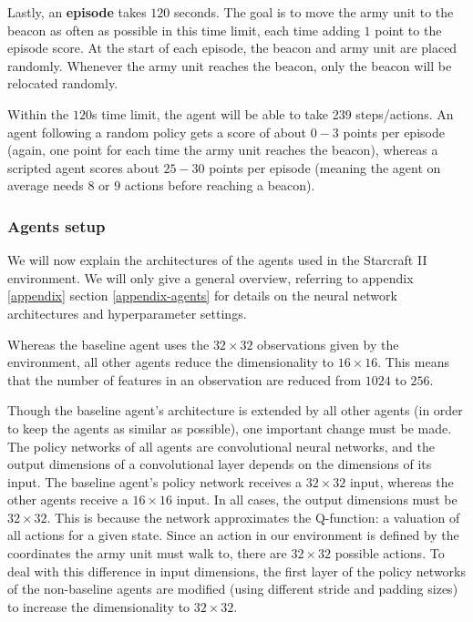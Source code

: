 Lastly, an \textbf{episode} takes $120$ seconds. The goal is to move the army unit to the beacon as often as possible in this time limit, each time adding $1$ point to the episode score. At the start of each episode, the beacon and army unit are placed randomly. Whenever the army unit reaches the beacon, only the beacon will be relocated randomly. 

Within the $120$s time limit, the agent will be able to take 239 steps/actions. An agent following a random policy gets a score of about $0-3$ points per episode (again, one point for each time the army unit reaches the beacon), whereas a scripted agent scores about $25-30$ points per episode (meaning the agent on average needs $8$ or $9$ actions before reaching a beacon).

\subsubsection{Agents setup}
We will now explain the architectures of the agents used in the Starcraft II environment. We will only give a general overview, referring to appendix \ref{appendix} section \ref{appendix-agents} for details on the neural network architectures and hyperparameter settings. 

Whereas the baseline agent uses the $32 \times 32$ observations given by the environment, all other agents reduce the dimensionality to $16 \times 16$. This means that the number of features in an observation are reduced from $1024$ to $256$.

Though the baseline agent's architecture is extended by all other agents (in order to keep the agents as similar as possible), one important change must be made. The policy networks of all agents are convolutional neural networks, and the output dimensions of a convolutional layer depends on the dimensions of its input. The baseline agent's policy network receives a $32 \times 32$ input, whereas the other agents receive a $16 \times 16$ input. In all cases, the output dimensions must be $32 \times 32$. This is because the network approximates the Q-function: a valuation of all actions for a given state. Since an action in our environment is defined by the coordinates the army unit must walk to, there are $32 \times 32$ possible actions. To deal with this difference in input dimensions, the first layer of the policy networks of the non-baseline agents are modified (using different stride and padding sizes) to increase the dimensionality to $32 \times 32$.\newline

